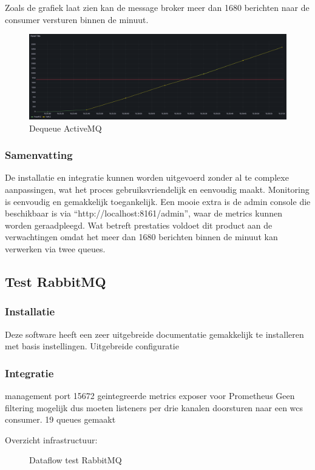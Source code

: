 Zoals de grafiek laat zien kan de message broker meer dan 1680 berichten naar de consumer versturen binnen de minuut.
\begin{figure}[h!]
  \centering
  \includegraphics[width=.9\textwidth]{img/amq-dequeue-count.png}
  \caption{\label{fig:amq_dequeue_count}Dequeue ActiveMQ}
\end{figure}

\subsubsection{Samenvatting}
De installatie en integratie kunnen worden uitgevoerd zonder al te complexe aanpassingen, 
wat het proces gebruiksvriendelijk en eenvoudig maakt.
Monitoring is eenvoudig en gemakkelijk toegankelijk. 
Een mooie extra is de admin console die beschikbaar is via ``http://localhost:8161/admin'', waar de metrics kunnen worden geraadpleegd.
Wat betreft prestaties voldoet dit product aan de verwachtingen omdat het meer dan 1680 berichten  binnen de minuut kan verwerken via twee queues.

\subsection{Test RabbitMQ}
\subsubsection{Installatie}
Deze software heeft een zeer uitgebreide documentatie
gemakkelijk te installeren met basis instellingen.
Uitgebreide configuratie


\subsubsection{Integratie}
management port 15672
geintegreerde metrics exposer voor Prometheus
Geen filtering mogelijk dus moeten listeners per drie kanalen doorsturen naar een wcs consumer.
19 queues gemaakt


Overzicht infrastructuur:
\begin{figure}[h!]
  \centering
  \caption{\label{fig:test_rabbitmq_dataflow}Dataflow test RabbitMQ}
\end{figure}

